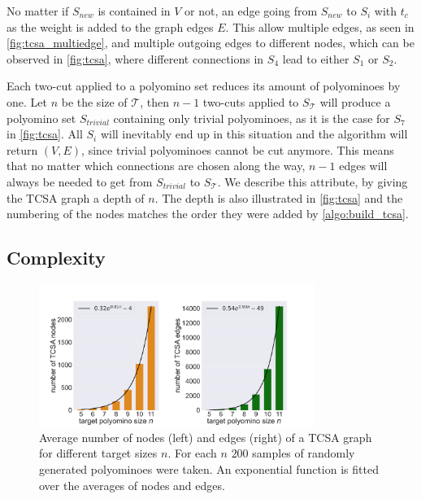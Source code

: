 No matter if $S_\textit{new}$ is contained in $V$ or not, an edge going from $S_\textit{new}$ to $S_i$ with $t_c$ as the weight is added to the graph edges $E$.
This allow multiple edges, as seen in \autoref{fig:tcsa_multiedge}, and multiple outgoing edges to different nodes, which can be observed in \autoref{fig:tcsa}, where different connections in $S_4$ lead to either $S_1$ or $S_2$.

Each two-cut applied to a polyomino set reduces its amount of polyominoes by one.
Let $n$ be the size of $\mathcal{T}$, then $n-1$ two-cuts applied to $S_\mathcal{T}$ will produce a polyomino set $S_\textit{trivial}$ containing only trivial polyominoes, as it is the case for $S_7$ in \autoref{fig:tcsa}.
All $S_i$ will inevitably end up in this situation and the algorithm will return $(V,E)$, since trivial polyominoes cannot be cut anymore.
This means that no matter which connections are chosen along the way, $n-1$ edges will always be needed to get from $S_\textit{trivial}$ to $S_\mathcal{T}$.
We describe this attribute, by giving the TCSA graph a depth of $n$.
The depth is also illustrated in \autoref{fig:tcsa} and the numbering of the nodes matches the order they were added by \autoref{algo:build_tcsa}.

\subsection{Complexity}

\begin{figure}
	\centering
	\includegraphics[width=0.8\textwidth]{figures/plots/tcsa_nodes_edges.pdf}
	\caption[Average two-cut-sub-assembly nodes and edges for target size $n$.]{Average number of nodes (left) and edges (right) of a TCSA graph for different target sizes $n$. For each $n$ $200$ samples of randomly generated polyominoes were taken. An exponential function is fitted over the averages of nodes and edges.}
	\label{fig:tcsa_plot}
\end{figure}

